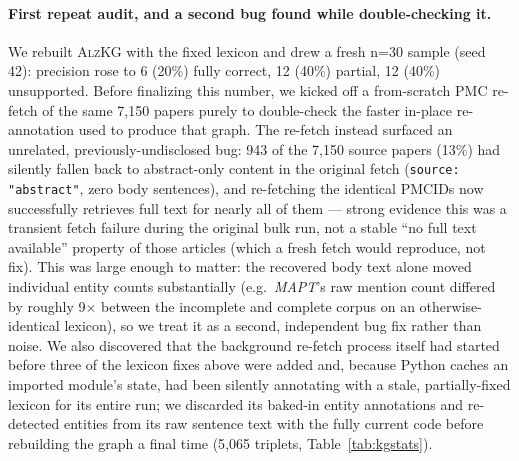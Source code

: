 \documentclass{article}
\begin{document}
\paragraph{First repeat audit, and a second bug found while double-checking it.} We rebuilt \textsc{AlzKG} with the fixed lexicon and drew a fresh n=30 sample (seed 42): precision rose to 6 (20\%) fully correct, 12 (40\%) partial, 12 (40\%) unsupported. Before finalizing this number, we kicked off a from-scratch PMC re-fetch of the same 7{,}150 papers purely to double-check the faster in-place re-annotation used to produce that graph. The re-fetch instead surfaced an unrelated, previously-undisclosed bug: 943 of the 7{,}150 source papers (13\%) had silently fallen back to abstract-only content in the original fetch (\texttt{source: "abstract"}, zero body sentences), and re-fetching the identical PMCIDs now successfully retrieves full text for nearly all of them --- strong evidence this was a transient fetch failure during the original bulk run, not a stable ``no full text available'' property of those articles (which a fresh fetch would reproduce, not fix). This was large enough to matter: the recovered body text alone moved individual entity counts substantially (e.g.\ \textit{MAPT}'s raw mention count differed by roughly 9$\times$ between the incomplete and complete corpus on an otherwise-identical lexicon), so we treat it as a second, independent bug fix rather than noise. We also discovered that the background re-fetch process itself had started before three of the lexicon fixes above were added and, because Python caches an imported module's state, had been silently annotating with a stale, partially-fixed lexicon for its entire run; we discarded its baked-in entity annotations and re-detected entities from its raw sentence text with the fully current code before rebuilding the graph a final time (5{,}065 triplets, Table~\ref{tab:kgstats}).
\end{document}
